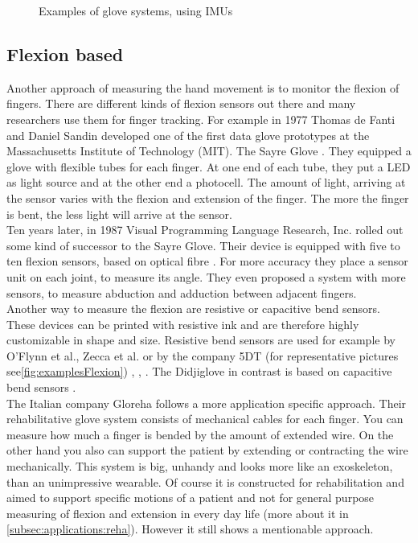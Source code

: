 \begin{figure}[h]
	\hfill
	
	\caption[Glove systems using IMUs]{Examples of glove systems, using \acp{IMU}}
	\label{fig:examplesIMU}
\end{figure}

\subsection{Flexion based} \label{subsec:approaches:flexion}
Another approach of measuring the hand movement is to monitor the flexion of fingers. There are different kinds of flexion sensors out there and many researchers use them for finger tracking. For example in 1977 Thomas de Fanti and Daniel Sandin developed one of the first data glove prototypes at the Massachusetts Institute of Technology (MIT). The Sayre Glove  \cite{sturman1994survey}. They equipped a glove with flexible tubes for each finger. At one end of each tube, they put a LED as light source and at the other end a photocell. The amount of light, arriving at the sensor varies with the flexion and extension of the finger. The more the finger is bent, the less light will arrive at the sensor.\\
Ten years later, in 1987 Visual Programming Language Research, Inc. rolled out some kind of successor to the Sayre Glove. Their device is equipped with five to ten flexion sensors, based on optical fibre \cite{zimmerman1985optical}. For more accuracy they place a sensor unit on each joint, to measure its angle. They even proposed a system with more sensors, to measure abduction and adduction between adjacent fingers.\\
Another way to measure the flexion are resistive or capacitive bend sensors. These devices can be printed with resistive ink and are therefore highly customizable in shape and size. Resistive bend sensors are used for example by O'Flynn et al., Zecca et al. or by the company 5DT (for representative pictures see\ref{fig:examplesFlexion}) \cite{o2013novel}, \cite{zecca2007development}, \cite{FifthDimension}. The Didjiglove in contrast is based on capacitive bend sensors \cite{sturman1994survey}.\\
The Italian company Gloreha \cite{Gloreha} follows a more application specific approach. Their rehabilitative glove system consists of mechanical cables for each finger. You can measure how much a finger is bended by the amount of extended wire. On the other hand you also can support the patient by extending or contracting the wire mechanically. This system is big, unhandy and looks more like an exoskeleton, than an unimpressive wearable. Of course it is constructed for rehabilitation and aimed to support specific motions of a patient and not for general purpose measuring of flexion and extension in every day life (more about it in \ref{subsec:applications:reha}). However it still shows a mentionable approach.

